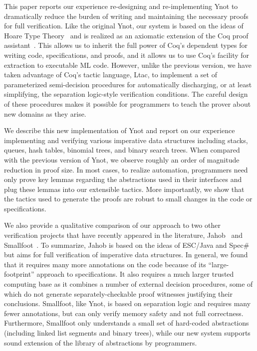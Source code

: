\documentclass[preprint,nocopyrightspace]{sigplanconf}
\begin{document}
This paper reports our experience re-designing and re-implementing
Ynot to dramatically reduce the burden of writing and maintaining the
necessary proofs for full verification.  Like the original Ynot, our
system is based on the ideas of Hoare Type Theory~\cite{htt} and is
realized as an axiomatic extension of the Coq proof
assistant~\cite{CoqArt}.  This allows us to inherit the full power of
Coq's dependent types for writing code, specifications, and proofs,
and it allows us to use Coq's facility for extraction to executable ML
code.  However, unlike the previous version, we have taken advantage
of Coq's tactic language, Ltac, to implement a set of parameterized
semi-decision procedures for automatically discharging, or at least
simplifying, the separation logic-style verification conditions.  The
careful design of these procedures makes it possible for programmers
to teach the prover about new domains as they arise.

We describe this new implementation of Ynot and report on our
experience implementing and verifying various imperative data
structures including stacks, queues, hash tables, binomial trees, and
binary search trees.  When compared with the previous version of Ynot,
we observe roughly an order of magnitude reduction in proof size.  In
most cases, to realize automation, programmers need only prove key
lemmas regarding the abstractions used in their interfaces and plug
these lemmas into our extensible tactics.  More importantly, we show
that the tactics used to generate the proofs are robust to small
changes in the code or specifications.

We also provide a qualitative comparison of our approach to two other
verification projects that have recently appeared in the literature,
Jahob~\cite{jahob} and Smallfoot~\cite{smallfoot}.  To summarize,
Jahob is based on the ideas of ESC/Java and Spec\# but aims for full
verification of imperative data structures.  In general, we found that
it requires many more annotations on the code because of its
``large-footprint'' approach to specifications.  It also requires a
much larger trusted computing base as it combines a number of external
decision procedures, some of which do not generate
separately-checkable proof witnesses justifying their conclusions.
Smallfoot, like Ynot, is based on separation logic and requires many
fewer annotations, but can only verify memory safety and not full
correctness.  Furthermore, Smallfoot only understands a small set of
hard-coded abstractions (including linked list segments and binary trees),
while our new system supports sound extension of the library of
abstractions by programmers.
\end{document}
